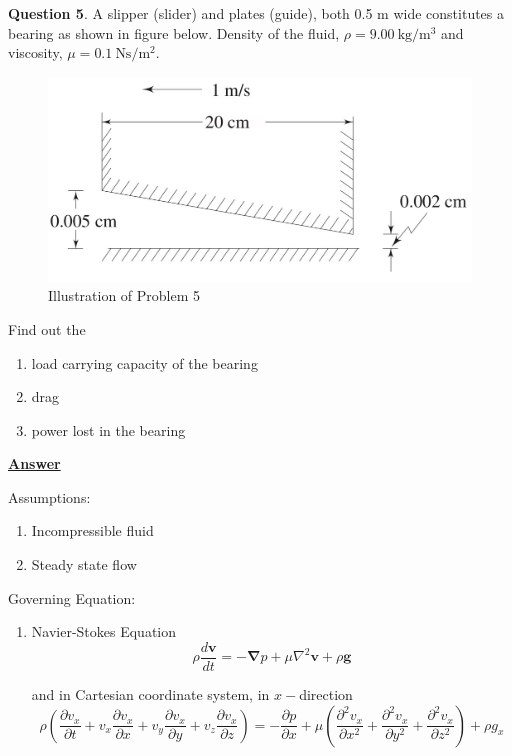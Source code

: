 \documentclass[10pt]{article}
\begin{document}
\break

\textbf{Question 5}. A slipper (slider) and plates (guide), both 0.5 m wide constitutes a bearing as shown in figure below. Density of the fluid, $\rho = 9.00\ \textrm{kg/}\textrm{m}^3$ and viscosity, $\mu = 0.1\ \textrm{Ns/}\textrm{m}^2$.

\begin{figure}[h]
    \centering
    \includegraphics[scale=0.83]{Problem5.jpg}
    \caption{Illustration of Problem 5}
    \label{fig:figprob5}
\end{figure}

Find out the
\begin{enumerate}
    \item load carrying capacity of the bearing
    \item drag
    \item power lost in the bearing 
\end{enumerate}

\hfill

\textbf{\underline{Answer}}

Assumptions:
\begin{enumerate}
    \item Incompressible fluid
    \item Steady state flow
\end{enumerate}

\hfill

Governing Equation:
\begin{enumerate}
    \item Navier-Stokes Equation
    \begin{equation}
        \rho \frac{d \mathbf{v}}{dt} = -\mathbf{\nabla}p + \mu \nabla^2 \mathbf{v} + \rho \mathbf{g}
    \end{equation}

    and in Cartesian coordinate system, in $x-$direction
    \begin{equation}
        \rho \left( \frac{\partial v_x}{\partial t} + v_x \frac{\partial v_x}{\partial x} + v_y \frac{\partial v_x}{\partial y} + v_z \frac{\partial v_x}{\partial z} \right) = -\frac{\partial p}{\partial x} + \mu \left(\frac{\partial^2 v_x}{\partial x^2} + \frac{\partial^2 v_x}{\partial y^2} + \frac{\partial^2 v_x}{\partial z^2} \right) + \rho g_x
    \end{equation}
\end{enumerate}
\end{document}
